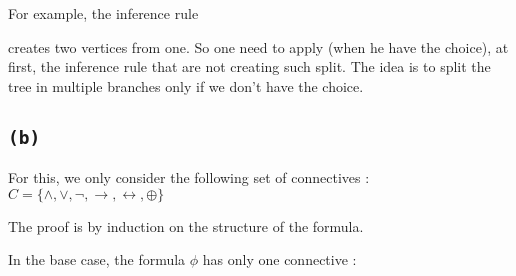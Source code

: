 \documentclass[a4paper,11pt]{report}
\begin{document}
For example, the inference rule

\begin{prooftree}
\end{prooftree}

creates two vertices from one. So one need to apply (when he have the choice),
at first, the inference rule that are not creating such split. The idea is to
split the tree in multiple branches only if we don't have the choice.

\subsection*{\texttt{(b)}}

For this, we only consider the following set of connectives : $C = \{\wedge, \vee,
\neg, \to, \leftrightarrow, \oplus\}$

The proof is by induction on the structure of the formula.

In the base case, the formula $\phi$ has only one connective :
\end{document}
